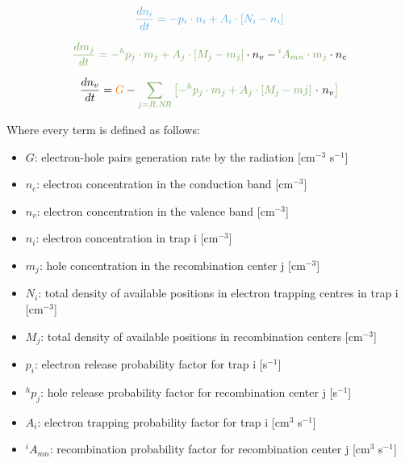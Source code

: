 \begin{equation} \label{eq:dn_idt}
  \textcolor{customblue}{\frac{dn_i}{dt} = -p_i \cdot n_i + A_i \cdot [N_i - n_i]}
\end{equation}

\begin{equation} \label{eq:dm_jdt}
  \textcolor{customgreen}{\frac{dm_j}{dt} = -^hp_j \cdot m_j + A_j \cdot [M_j - m_j]} \cdot n_v - \textcolor{customgreen}{^iA_{mn} \cdot m_j} \cdot n_c
\end{equation}

\begin{equation} \label{eq:dn_vdt}
  \frac{dn_v}{dt} = \textcolor{orange}{G} - \textcolor{customgreen}{\sum_{j=R, N\!R} \left[-^hp_j \cdot m_j + A_j \cdot [M_j - mj] \textcolor{black}{~ \cdot ~n_v}\right]} 
\end{equation}

\vspace{15pt}
Where every term is defined as follows:
\begin{itemize}[itemsep=0.2cm,parsep=0cm]
  \item $G$: electron-hole pairs generation rate by the radiation [cm$^{-3}$ s$^{-1}$]
  \item $n_c$: electron concentration in the conduction band [cm$^{-3}$]
  \item $n_v$: electron concentration in the valence band [cm$^{-3}$]
  \item $n_i$: electron concentration in trap i [cm$^{-3}$]
  \item $m_j$: hole concentration in the recombination center j [cm$^{-3}$]
  \item $N_i$: total density of available positions in electron trapping centres in trap i [cm$^{-3}$]
  \item $M_j$: total density of available positions in recombination centers [cm$^{-3}$]
  \item $p_i$: electron release probability factor for trap i [s$^{-1}$]
  \item $^hp_j$: hole release probability factor for recombination center j [s$^{-1}$]
  \item $A_i$: electron trapping probability factor for trap i [cm$^{3}$ s$^{-1}$]
  \item $^iA_{mn}$: recombination probability factor for recombination center j [cm$^{3}$ s$^{-1}$]
\end{itemize}

\vspace{10pt}

